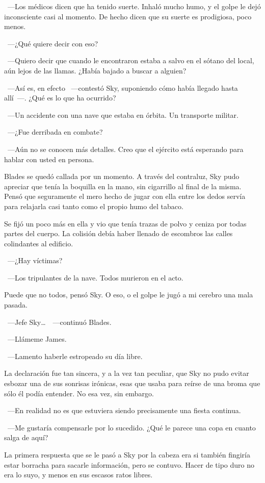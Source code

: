 ~---Los médicos dicen que ha tenido suerte. Inhaló mucho humo, y el golpe le dejó inconsciente casi al momento. De hecho dicen que su suerte es prodigiosa, poco menos.

~---¿Qué quiere decir con eso?

~---Quiero decir que cuando le encontraron estaba a salvo en el sótano del local, aún lejos de las llamas. ¿Había bajado a buscar a alguien?

~---Así es, en efecto ~---contestó Sky, suponiendo cómo había llegado hasta allí~---. ¿Qué es lo que ha ocurrido?

~---Un accidente con una nave que estaba en órbita. Un transporte militar.

~---¿Fue derribada en combate?

~---Aún no se conocen más detalles. Creo que el ejército está esperando para hablar con usted en persona.

Blades se quedó callada por un momento. A través del contraluz, Sky pudo apreciar que tenía la boquilla en la mano, sin cigarrillo al final de la misma. Pensó que seguramente el mero hecho de jugar con ella entre los dedos servía para relajarla casi tanto como el propio humo del tabaco.

Se fijó un poco más en ella y vio que tenía trazas de polvo y ceniza por todas partes del cuerpo. La colisión debía haber llenado de escombros las calles colindantes al edificio.

~---¿Hay víctimas?

~---Los tripulantes de la nave. Todos murieron en el acto.

Puede que no todos, pensó Sky. O eso, o el golpe le jugó a mi cerebro una mala pasada.

~---Jefe Sky\dots\ ~---continuó Blades.

~---Llámeme James.

~---Lamento haberle estropeado su día libre.

La declaración fue tan sincera, y a la vez tan peculiar, que Sky no pudo evitar esbozar una de sus sonrisas irónicas, esas que usaba para reírse de una broma que sólo él podía entender. No esa vez, sin embargo.

~---En realidad no es que estuviera siendo precisamente una fiesta continua.

~---Me gustaría compensarle por lo sucedido. ¿Qué le parece una copa en cuanto salga de aquí?

La primera respuesta que se le pasó a Sky por la cabeza era si también fingiría estar borracha para sacarle información, pero se contuvo. Hacer de tipo duro no era lo suyo, y menos en sus escasos ratos libres.

